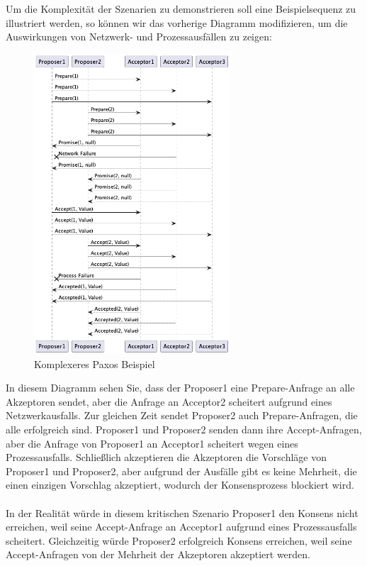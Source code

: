 Um die Komplexität der Szenarien zu demonstrieren soll eine Beispielsequenz zu illustriert werden, so können wir das vorherige Diagramm modifizieren, um die Auswirkungen von Netzwerk- und Prozessausfällen zu zeigen:
\begin{figure}[!ht]
  \centering
  \includegraphics[width=0.65\textwidth]{fig/uml/paxos-issue}
  \caption{Komplexeres Paxos Beispiel}
  \label{fig:simple-paxos-issue}
\end{figure}
In diesem Diagramm sehen Sie, dass der Proposer1 eine Prepare-Anfrage an alle Akzeptoren sendet, aber die Anfrage an Acceptor2 scheitert aufgrund eines Netzwerkausfalls. Zur gleichen Zeit sendet Proposer2 auch Prepare-Anfragen, die alle erfolgreich sind. Proposer1 und Proposer2 senden dann ihre Accept-Anfragen, aber die Anfrage von Proposer1 an Acceptor1 scheitert wegen eines Prozessausfalls. Schließlich akzeptieren die Akzeptoren die Vorschläge von Proposer1 und Proposer2, aber aufgrund der Ausfälle gibt es keine Mehrheit, die einen einzigen Vorschlag akzeptiert, wodurch der Konsensprozess blockiert wird.
\\\\
In der Realität würde in diesem kritischen Szenario Proposer1 den Konsens nicht erreichen, weil seine Accept-Anfrage an Acceptor1 aufgrund eines Prozessausfalls scheitert. Gleichzeitig würde Proposer2 erfolgreich Konsens erreichen, weil seine Accept-Anfragen von der Mehrheit der Akzeptoren akzeptiert werden.
